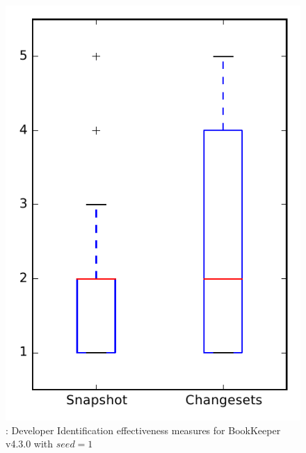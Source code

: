 
\begin{figure}
\centering
\includegraphics[height=0.4\textheight]{figures/dit_seed/rq1_bookkeeper_1}
\caption{\rtwo: Developer Identification effectiveness measures for BookKeeper v4.3.0 with $seed=1$}
\label{fig:dit_seed:rq1:bookkeeper}
\end{figure}
